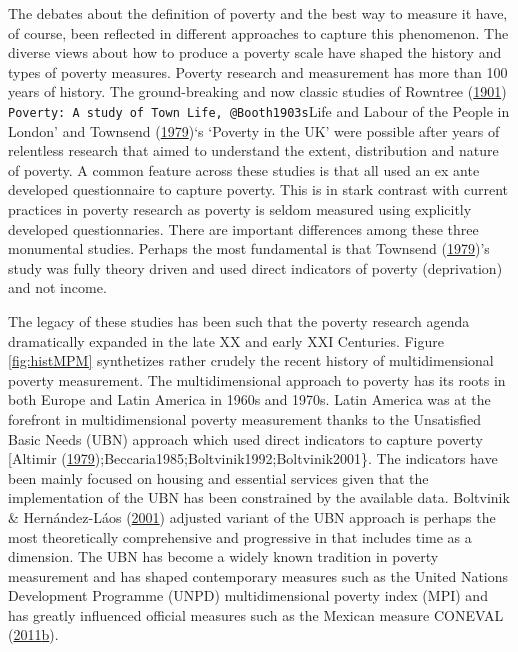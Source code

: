 \documentclass[]{book}
\begin{document}
The debates about the definition of poverty and the best way to measure it have, of course, been reflected in different approaches to capture this phenomenon. The diverse views about how to produce a poverty scale have shaped the history and types of poverty measures. Poverty research and measurement has more than 100 years of history. The ground-breaking and now classic studies of Rowntree (\protect\hyperlink{ref-Rowntree1901}{1901}) \texttt{Poverty:\ A\ study\ of\ Town\ Life\textquotesingle{},\ @Booth1903\textquotesingle{}s}Life and Labour of the People in London' and Townsend (\protect\hyperlink{ref-Townsend1979}{1979})`s `Poverty in the UK' were possible after years of relentless research that aimed to understand the extent, distribution and nature of poverty. A common feature across these studies is that all used an ex ante developed questionnaire to capture poverty. This is in stark contrast with current practices in poverty research as poverty is seldom measured using explicitly developed questionnaries. There are important differences among these three monumental studies. Perhaps the most fundamental is that Townsend (\protect\hyperlink{ref-Townsend1979}{1979})'s study was fully theory driven and used direct indicators of poverty (deprivation) and not income.

The legacy of these studies has been such that the poverty research agenda dramatically expanded in the late XX and early XXI Centuries. Figure \ref{fig:histMPM} synthetizes rather crudely the recent history of multidimensional poverty measurement. The multidimensional approach to poverty has its roots in both Europe and Latin America in 1960s and 1970s. Latin America was at the forefront in multidimensional poverty measurement thanks to the Unsatisfied Basic Needs (UBN) approach which used direct indicators to capture poverty {[}Altimir (\protect\hyperlink{ref-Altimir1979}{1979});Beccaria1985;Boltvinik1992;Boltvinik2001\}. The indicators have been mainly focused on housing and essential services given that the implementation of the UBN has been constrained by the available data. Boltvinik \& Hernández-Láos (\protect\hyperlink{ref-Boltvinik2001}{2001}) adjusted variant of the UBN approach is perhaps the most theoretically comprehensive and progressive in that includes time as a dimension. The UBN has become a widely known tradition in poverty measurement and has shaped contemporary measures such as the United Nations Development Programme (UNPD) multidimensional poverty index (MPI) and has greatly influenced official measures such as the Mexican measure CONEVAL (\protect\hyperlink{ref-CONEVAL2011d}{2011}\protect\hyperlink{ref-CONEVAL2011d}{b}).
\end{document}
